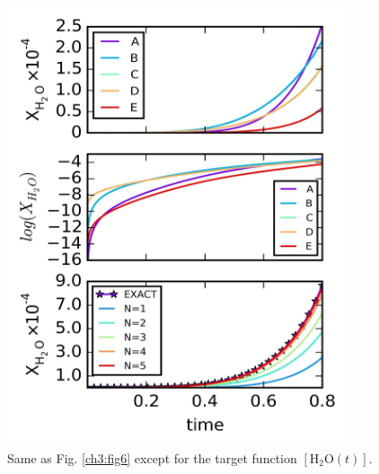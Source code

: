 \begin{figure}[htbp]
	\caption[Pathway probabilities for H$_2$O of H$_2$-O$_2$ combustion system]{Same as Fig. \ref{ch3:fig6} except for the target function $\left[ \text{H}_2\text{O}(t) \right]$.}
    \begin{center}
	\includegraphics[width=100mm]{figs/chapter3/fig8.jpg}
    \end{center}
\label{ch3:fig8}
\end{figure}
\paragraph{}
\newline
